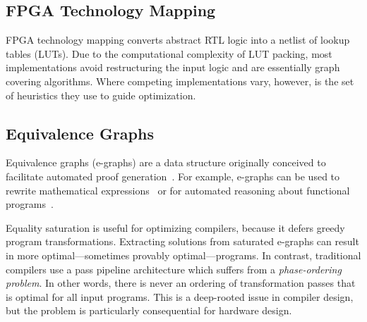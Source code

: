 
\subsection{FPGA Technology Mapping}\label{sec:background:fpga}
FPGA technology mapping converts abstract RTL logic into a netlist of lookup
tables (LUTs). Due to the computational complexity of LUT packing, most
implementations avoid restructuring the input logic and are essentially graph
covering algorithms. Where competing implementations vary, however, is the set
of heuristics they use to guide optimization.

\subsection{Equivalence Graphs}\label{sec:background:egraph}
Equivalence graphs (e-graphs) are a data structure originally conceived to
facilitate automated proof generation~\cite{eggpaper, eqsat}. For example,
e-graphs can be used to rewrite mathematical expressions~\cite{egraphmath} or
for automated reasoning about functional programs~\cite{cclemma}.

Equality saturation is useful for optimizing compilers, because it defers
greedy program transformations. Extracting solutions from saturated e-graphs
can result in more optimal---sometimes provably optimal---programs. In
contrast, traditional compilers use a pass pipeline architecture which suffers
from a \textit{phase-ordering problem}. In other words, there is never an
ordering of transformation passes that is optimal for all input programs. This
is a deep-rooted issue in compiler design, but the problem is particularly
consequential for hardware design.
